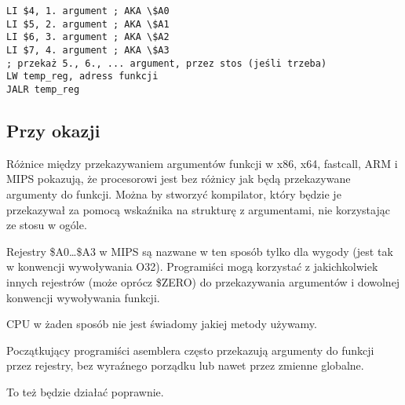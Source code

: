 \begin{lstlisting}[caption=MIPS (konwencja wywoływania O32),style=customasmMIPS]
LI $4, 1. argument ; AKA \$A0
LI $5, 2. argument ; AKA \$A1
LI $6, 3. argument ; AKA \$A2
LI $7, 4. argument ; AKA \$A3
; przekaż 5., 6., ... argument, przez stos (jeśli trzeba)
LW temp_reg, adress funkcji
JALR temp_reg
\end{lstlisting}

\subsection{Przy okazji}

Różnice między przekazywaniem argumentów funkcji w x86, x64, fastcall, ARM i MIPS pokazują, że procesorowi jest bez różnicy jak będą
przekazywane argumenty do funkcji. Można by stworzyć kompilator, który będzie je przekazywał za pomocą wskaźnika na strukturę z argumentami, nie korzystając ze stosu w ogóle.

Rejestry \$A0\dots \$A3 w MIPS są nazwane w ten sposób tylko dla wygody (jest tak w konwencji wywoływania O32).
Programiści mogą korzystać z jakichkolwiek innych rejestrów (może oprócz \$ZERO) do przekazywania argumentów i dowolnej konwencji wywoływania funkcji.

\ac{CPU} w żaden sposób nie jest świadomy jakiej metody używamy.

Początkujący programiści asemblera często przekazują argumenty do funkcji przez rejestry, bez wyraźnego porządku lub nawet przez zmienne globalne.

To też będzie działać poprawnie.



